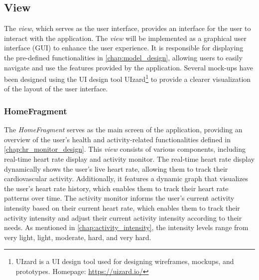 \subsection{View}
\label{chap:view_design}
The \emph{view}, which serves as the user interface, provides an interface for the user to interact with the application. The \emph{view} will be implemented as a graphical user interface (GUI) to enhance the user experience. 
It is responsible for displaying the pre-defined functionalities in \autoref{chap:model_design}, allowing users to easily navigate and use the features provided by the application. 
Several mock-ups have been designed using the UI design tool UIzard\footnote{UIzard is a UI design tool used for designing wireframes, mockups, and prototypes. Homepage: \url{https://uizard.io/}} to provide a clearer visualization of the layout of the user interface.

\subsubsection{HomeFragment}
The \emph{HomeFragment} serves as the main screen of the application, providing an overview of the user's health and activity-related functionalities defined in \autoref{chap:hr_monitor_design}. This \emph{view} consists of various components, including real-time heart rate display and activity monitor.
The real-time heart rate display dynamically shows the user's live heart rate, allowing them to track their cardiovascular activity. Additionally, it features a dynamic graph that visualizes the user's heart rate history, which enables them to track their heart rate patterns over time.
The activity monitor informs the user's current activity intensity based on their current heart rate, which enables them to track their activity intensity and adjust their current activity intensity according to their needs. As mentioned in \autoref{chap:activity_intensity}, the intensity levels range from very light, light, moderate, hard, and very hard.

